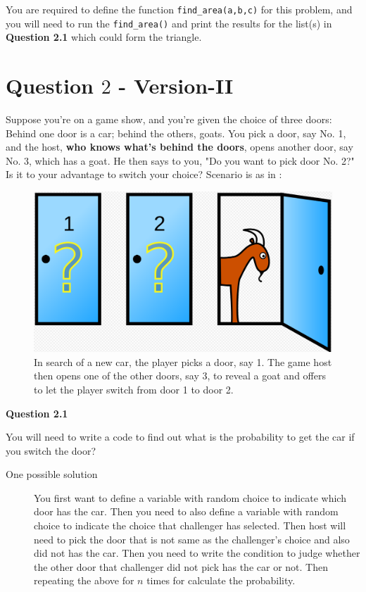 \documentclass[a4paper]{article}
\begin{document}
\begin{answer}
    You are required to define the function \texttt{find_area(a,b,c)} for this problem, 
    and you will need to run the \texttt{find_area()} and print the results for the list(s) in \textbf{Question 2.1}
    which could form the triangle.

    \end{answer}
    
    
    \section{Question $2$ - Version-II}
    
    \begin{answer}
    
    Suppose you're on a game show, and you're given the choice of three doors: Behind one door is a car; behind the others, goats. You pick a door, say No. 1, and the host, \textbf{who knows what's behind the doors}, opens another door, say No. 3, which has a goat. He then says to you, "Do you want to pick door No. 2?" Is it to your advantage to switch your choice? Scenario is as in :
    \begin{figure}[H]
        \centering
        \includegraphics[width=0.65\columnwidth]{figure/monte_hall.png}
        \caption{In search of a new car, the player picks a door, say 1. The game host then opens one of the other doors, say 3, to reveal a goat and offers to let the player switch from door 1 to door 2.}
        \label{fig:even}
    \end{figure}
    

    \textbf{Question 2.1}
 
    You will need to write a code to find out what is the probability to get the car if you switch the door?
    \begin{description}
            \item[One possible solution] 
            You first want to define a variable with random choice to indicate which door has the car.
            Then you need to also define a variable with random choice to indicate the choice that challenger has selected.
            Then host will need to pick the door that is not same as the challenger's choice and also did not has the car.
            Then you need to write the condition to judge whether the other door that challenger did not pick has the car or not. 
            Then repeating the above for $n$ times for calculate the probability.
        \end{description} 
    
           
    \end{answer}
    
    
\end{document}
